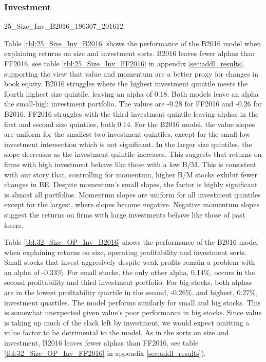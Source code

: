 
\subsubsection{Investment}

{25_Size_Inv_B2016_196307_201612}

Table \ref{tbl:25_Size_Inv_B2016} shows the performance of the B2016 model when explaining
returns on size and investment sorts. B2016 leaves fewer alphas than FF2016, see table
\ref{tbl:25_Size_Inv_FF2016} in appendix \ref{sec:addl_results}, supporting the view that
value and momentum are a better proxy for changes in book equity. B2016 struggles where
the highest investment quintile meets the fourth highest size quintile, leaving an alpha
of 0.18. Both models leave an alpha the small-high investment portfolio. The values are
-0.28 for FF2016 and -0.26 for B2016. FF2016 struggles with the third investment quintile
leaving alphas in the first and second  size quintiles, both 0.14. For the B2016 model,
the value slopes are uniform for the smallest two investment quintiles, except for the
small-low investment intersection which is not significant. In the larger size quintiles,
the slope decreases as the investment quintile increases. This suggests that returns on
firms with high investment behave like those with a low B/M. This is consistent with our
story that, controlling for momentum, higher B/M stocks exhibit fewer changes in BE.
Despite momentum's small slopes, the factor is highly significant is almost all
portfolios. Momentum slopes are uniform for all investment quintiles except for the
largest, where slopes become negative. Negative momentum slopes suggest the returns on
firms with large investments behave like those of past losers.


Table \ref{tbl:32_Size_OP_Inv_B2016} shows the performance of the B2016 model when
explaining returns on size, operating profitability and investment sorts. Small stocks
that invest aggresively despite weak profits remain a problem with an alpha of -0.33\%.
For small stocks, the only other alpha, 0.14\%, occurs in the second profitability and
third investment portfolio. For big stocks, both alphas are in the lowest profitability
quartile in the second, -0.26\%, and highest, 0.27\%, investment quartiles. The model
performs similarly for small and big stocks. This is somewhat unexpected given value's
poor performance in big stocks. Since value is taking up much of the slack left by
investment, we would expect omitting a value factor to be detrimental to the model. As in
the sorts on size and investment, B2016 leaves fewer alphas than FF2016, see table
\ref{tbl:32_Size_OP_Inv_FF2016} in appendix \ref{sec:addl_results}).



